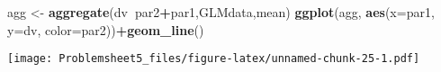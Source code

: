 \documentclass[
]{article}
\newenvironment{Shaded}{\begin{snugshade}}{\end{snugshade}}
\newcommand{\DataTypeTok}[1]{\textcolor[rgb]{0.13,0.29,0.53}{#1}}
\newcommand{\KeywordTok}[1]{\textcolor[rgb]{0.13,0.29,0.53}{\textbf{#1}}}
\newcommand{\NormalTok}[1]{#1}
\newcommand{\OperatorTok}[1]{\textcolor[rgb]{0.81,0.36,0.00}{\textbf{#1}}}
\newcommand{\StringTok}[1]{\textcolor[rgb]{0.31,0.60,0.02}{#1}}
\begin{document}
\begin{Shaded}
\begin{Highlighting}[]
\NormalTok{agg <-}\StringTok{ }\KeywordTok{aggregate}\NormalTok{(dv}\OperatorTok{~}\NormalTok{par2}\OperatorTok{+}\NormalTok{par1,GLMdata,mean)}
\KeywordTok{ggplot}\NormalTok{(agg, }\KeywordTok{aes}\NormalTok{(}\DataTypeTok{x=}\NormalTok{par1, }\DataTypeTok{y=}\NormalTok{dv, }\DataTypeTok{color=}\NormalTok{par2))}\OperatorTok{+}\KeywordTok{geom_line}\NormalTok{()}
\end{Highlighting}
\end{Shaded}

\texttt{[image: Problemsheet5\_files/figure-latex/unnamed-chunk-25-1.pdf]}
\end{document}
